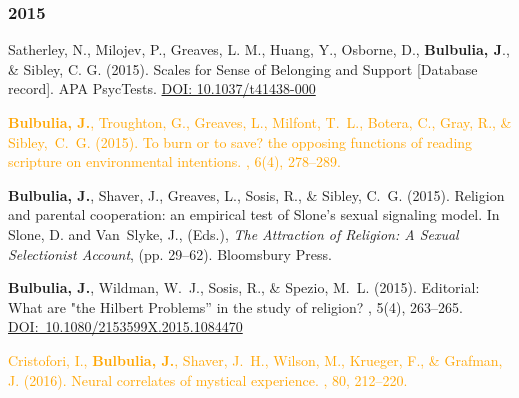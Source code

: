\documentclass{article}
\begin{document}
\begin{thebibliography}{99}
\subsubsection*{2015} 


Satherley, N., Milojev, P., Greaves, L. M., Huang, Y., Osborne, D., {\bf Bulbulia, J}., \& Sibley, C. G. (2015).
\newblock Scales for Sense of Belonging and Support [Database record].
\newblock APA PsycTests.
\href{https://doi.org/10.1037/t41438-000}{DOI: 10.1037/t41438-000}


\textcolor{Orange}{{\bf Bulbulia, J.}, Troughton, G., Greaves, L., Milfont, T.~L., Botera, C., Gray, R., \& Sibley,~C.~G. (2015).
\newblock To burn or to save? the opposing functions of reading scripture on
  environmental intentions.
, 6(4), 278--289. }


{\bf Bulbulia, J.}, Shaver, J., Greaves, L., Sosis, R., \& Sibley, C.~G. (2015).
\newblock Religion and parental cooperation: an empirical test of {S}lone's
  sexual signaling model.
\newblock In Slone, D. and Van~Slyke, J., (Eds.), {\em The Attraction of
  Religion: A Sexual Selectionist Account}, (pp. 29--62). Bloomsbury Press. 
 

{\bf Bulbulia, J.}, Wildman, W.~J., Sosis, R., \& Spezio, M.~L. (2015). Editorial:
\newblock What are "the Hilbert Problems'' in the study of religion?
, 5(4), 263--265. 
\href{https://doi.org/ 10.1080/2153599X.2015.1084470}{DOI:~10.1080/2153599X.2015.1084470}


\textcolor{Orange}{Cristofori, I., {\bf Bulbulia, J.}, Shaver, J.~H., Wilson, M., Krueger, F., \& Grafman, J. (2016).
\newblock Neural correlates of mystical experience.
, 80, 212--220. }
 


\end{thebibliography}
\end{document}
